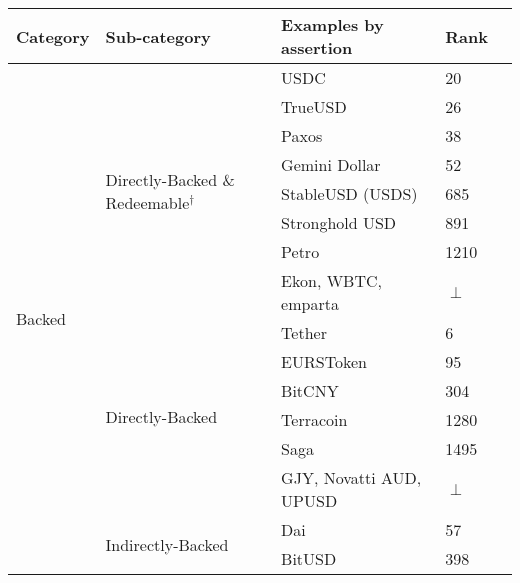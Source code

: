 \begin{table}[t]
\centering

\begin{tabular}{|l|l|l|l|l|}

\hline
\rowcolor{lightgray}
\textbf{Category} & \textbf{Sub-category} & \textbf{Examples by assertion} & Rank \\  \hline

\multirow{16}{*}{Backed}		& \multirow{8}{*}{Directly-Backed \& Redeemable$^{\dagger}$}		& USDC & 20 \\ \cline{3-4}
						&														& TrueUSD & 26 \\ \cline{3-4}	
						&														& Paxos & 38 \\ \cline{3-4}												
						&														& Gemini Dollar & 52 \\ \cline{3-4}
						&														& StableUSD (USDS) & 685 \\ \cline{3-4}
						&														& Stronghold USD & 891 \\ \cline{3-4}
						&														& Petro & 1210 \\ \cline{3-4}
						&														& \multicolumn{1}{p{5cm}|}{Ekon, WBTC, emparta} & $\perp$ \\ \cline{2-4}
						& \multirow{6}{*}{Directly-Backed}  								& Tether & 6 \\ \cline{3-4}
						&														& EURSToken & 95 \\ \cline{3-4}
						&														& BitCNY & 304 \\ \cline{3-4}
						&														& Terracoin & 1280 \\ \cline{3-4}
						&														& Saga & 1495 \\  \cline{3-4}
						&														& \multicolumn{1}{p{5cm}|}{GJY, Novatti AUD, UPUSD} & $\perp$ \\ \cline{2-4} 						
						& \multirow{2}{*}{Indirectly-Backed}								& Dai & 57 \\ \cline{3-4}
                                                &														& BitUSD & 398 \\  \cline{1-4}
 
                                                                                                                 
                                                                                                                 

\end{tabular}
\end{table}
